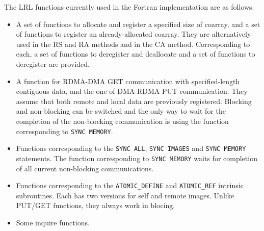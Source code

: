 The LRL functions currently used in the Fortran implementation are as follows.
\begin{itemize}
\item
A set of functions to allocate and register a specified size of coarray,
and a set of functions to register an already-allocated coarray.
They are alternatively used in the RS and RA methods and in the CA method.
Corresponding to each, a set of functions to deregister and deallocate and
a set of functions to deregister are provided.

\item
A function for RDMA-DMA GET communication with specified-length contiguous
data, and the one of DMA-RDMA PUT communication.
They assume that both remote and local data are previously registered.
Blocking and non-blocking can be switched and the only way to wait for
the completion of the non-blocking communication is using the function
corresponding to {\tt SYNC MEMORY}.

\item
Functions corresponding to the {\tt SYNC ALL}, {\tt SYNC IMAGES} and 
{\tt SYNC MEMORY} statements. 
The function corresponding to {\tt SYNC MEMORY} waits for completion of all 
current non-blocking communications.

\item
Functions corresponding to the {\tt ATOMIC\_DEFINE} and {\tt ATOMIC\_REF} 
intrinsic subroutines. Each has two versions for self and remote images.
Unlike PUT/GET functions, they always work in blocing.

\item
Some inquire functions.
\end{itemize}

